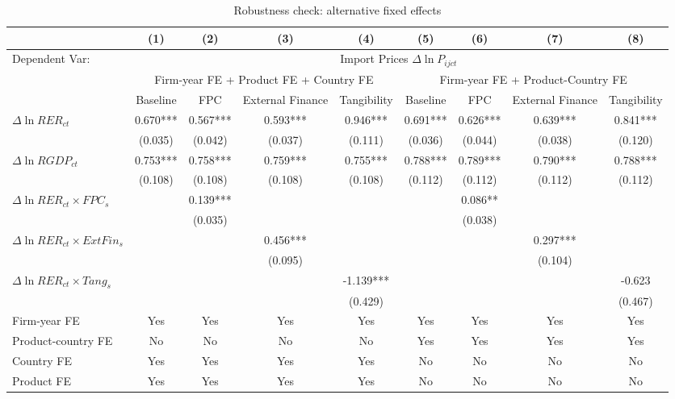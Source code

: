 \begin{table}
	\centering
	\caption{Robustness check: alternative fixed effects}
	\begin{threeparttable}
		\begin{tabular}{lcccccccc}
			\toprule
			& (1)   & (2)   & (3)   & (4) &  (5)  &  (6)  & (7)  & (8)\\
			\midrule
                Dependent Var: & \multicolumn{8}{c}{ Import Prices $\Delta \ln P_{ijct}$} \\
			& \multicolumn{4}{c}{Firm-year FE + Product FE + Country FE} & \multicolumn{4}{c}{Firm-year FE + Product-Country FE}\\
			& Baseline & FPC   & External Finance & Tangibility & Baseline & FPC & External Finance & Tangibility\\
			\midrule
			$\Delta \ln RER_{ct}$ & 0.670*** & 0.567*** & 0.593*** & 0.946*** & 0.691*** & 0.626*** & 0.639*** & 0.841*** \\
                & (0.035) & (0.042) & (0.037) & (0.111) & (0.036) & (0.044) & (0.038) & (0.120) \\
			$\Delta \ln RGDP_{ct}$ & 0.753*** & 0.758*** & 0.759*** & 0.755*** & 0.788*** & 0.789*** & 0.790*** & 0.788*** \\
			& (0.108) & (0.108) & (0.108) & (0.108) & (0.112) & (0.112) & (0.112) & (0.112) \\
			$\Delta \ln RER_{ct} \times FPC_{s}$ &  & 0.139*** &       &       &       & 0.086** &       &  \\
			&  & (0.035) &       &       &       & (0.038) &       &  \\
			$\Delta \ln RER_{ct} \times ExtFin_{s}$ &   &       & 0.456*** &       &       &       & 0.297*** &  \\
			&  &       & (0.095) &       &       &       & (0.104) &  \\
			$\Delta \ln RER_{ct} \times Tang_{s}$ &   &       &       & -1.139*** &       &       &       & -0.623 \\
			&   &       &       & (0.429) &       &       &       & (0.467) \\
                \midrule
			Firm-year FE  &  Yes   & Yes   & Yes & Yes & Yes & Yes & Yes & Yes\\
			Product-country FE & No & No & No & No & Yes & Yes & Yes & Yes\\
			Country FE &  Yes   & Yes   & Yes   & Yes & No & No & No & No\\
			Product FE &  Yes   & Yes   & Yes   & Yes & No & No & No & No\\

\end{tabular}
\end{threeparttable}
\end{table}
